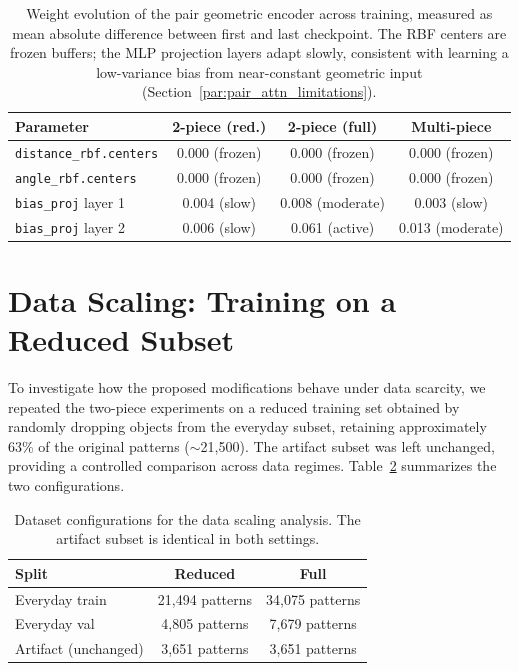\begin{table}[h]
\centering
\caption{Weight evolution of the pair geometric encoder across training, measured as mean absolute difference between first and last checkpoint. The RBF centers are frozen buffers; the MLP projection layers adapt slowly, consistent with learning a low-variance bias from near-constant geometric input (Section~\ref{par:pair_attn_limitations}).}
\label{tab:weight_evolution}
\begin{tabular}{lccc}
\toprule
\textbf{Parameter} & \textbf{2-piece (red.)} & \textbf{2-piece (full)} & \textbf{Multi-piece} \\
\midrule
\texttt{distance\_rbf.centers} & 0.000 (frozen) & 0.000 (frozen) & 0.000 (frozen) \\
\texttt{angle\_rbf.centers} & 0.000 (frozen) & 0.000 (frozen) & 0.000 (frozen) \\
\texttt{bias\_proj} layer 1 & 0.004 (slow) & 0.008 (moderate) & 0.003 (slow) \\
\texttt{bias\_proj} layer 2 & 0.006 (slow) & 0.061 (active) & 0.013 (moderate) \\
\bottomrule
\end{tabular}
\end{table}

\section{Data Scaling: Training on a Reduced Subset}
\label{sec:incomplete}
\label{sec:data_twist}

To investigate how the proposed modifications behave under data scarcity, we repeated the two-piece experiments on a reduced training set obtained by randomly dropping objects from the everyday subset, retaining approximately 63\% of the original patterns ($\sim$21,500). The artifact subset was left unchanged, providing a controlled comparison across data regimes. Table~\ref{tab:data_gap} summarizes the two configurations.

\begin{table}[h]
\centering
\caption{Dataset configurations for the data scaling analysis. The artifact subset is identical in both settings.}
\label{tab:data_gap}
\begin{tabular}{lcc}
\toprule
\textbf{Split} & \textbf{Reduced} & \textbf{Full} \\
\midrule
Everyday train & 21,494 patterns & 34,075 patterns \\
Everyday val & 4,805 patterns & 7,679 patterns \\
Artifact (unchanged) & 3,651 patterns & 3,651 patterns \\
\bottomrule
\end{tabular}
\end{table}

